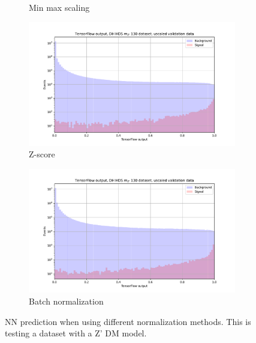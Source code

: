 \documentclass[14pt, a4paper]{book}
\begin{document}
\begin{figure}[!ht]
\begin{subfigure}[b]{0.49\textwidth}
      \caption{Min max scaling}
   \end{subfigure}
   \hfill
   \begin{subfigure}[b]{0.49\textwidth}
      \centering
      \includegraphics[width=1\textwidth]{Z_score/VAL_unscaled.pdf}
      \caption{Z-score}
   \end{subfigure}
   \hfill
   \begin{subfigure}[b]{0.49\textwidth}
      \centering
      \includegraphics[width=1\textwidth]{Batch_norm/VAL_unscaled.pdf}
      \caption{Batch normalization}
   \end{subfigure}
   \caption{NN prediction when using different normalization methods. This is testing a dataset with a Z' DM model.}\label{fig:DifferentNormalizations}
\end{figure}
\end{document}
